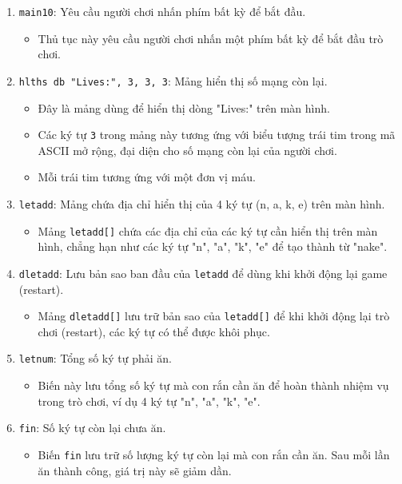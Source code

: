\documentclass[12pt]{article}
\begin{document}
\begin{enumerate}[label=\textbf{\arabic*.}]
    \item \texttt{main10}: Yêu cầu người chơi nhấn phím bất kỳ để bắt đầu.
    \begin{itemize}
        \item Thủ tục này yêu cầu người chơi nhấn một phím bất kỳ để bắt đầu trò chơi.
    \end{itemize}

    \item \texttt{hlths db "Lives:", 3, 3, 3}: Mảng hiển thị số mạng còn lại.
    \begin{itemize}
        \item Đây là mảng dùng để hiển thị dòng "Lives:" trên màn hình.
        \item Các ký tự \texttt{3} trong mảng này tương ứng với biểu tượng trái tim  trong mã ASCII mở rộng, đại diện cho số mạng còn lại của người chơi.
        \item Mỗi trái tim tương ứng với một đơn vị máu.
    \end{itemize}

    \item \texttt{letadd}: Mảng chứa địa chỉ hiển thị của 4 ký tự (n, a, k, e) trên màn hình.
    \begin{itemize}
        \item Mảng \texttt{letadd[]} chứa các địa chỉ của các ký tự cần hiển thị trên màn hình, chẳng hạn như các ký tự "n", "a", "k", "e" để tạo thành từ "nake".
    \end{itemize}

    \item \texttt{dletadd}: Lưu bản sao ban đầu của \texttt{letadd} để dùng khi khởi động lại game (restart).
    \begin{itemize}
        \item Mảng \texttt{dletadd[]} lưu trữ bản sao của \texttt{letadd[]} để khi khởi động lại trò chơi (restart), các ký tự có thể được khôi phục.
    \end{itemize}

    \item \texttt{letnum}: Tổng số ký tự phải ăn.
    \begin{itemize}
        \item Biến này lưu tổng số ký tự mà con rắn cần ăn để hoàn thành nhiệm vụ trong trò chơi, ví dụ 4 ký tự "n", "a", "k", "e".
    \end{itemize}

    \item \texttt{fin}: Số ký tự còn lại chưa ăn.
    \begin{itemize}
        \item Biến \texttt{fin} lưu trữ số lượng ký tự còn lại mà con rắn cần ăn. Sau mỗi lần ăn thành công, giá trị này sẽ giảm dần.
    \end{itemize}

\end{enumerate}
\end{document}
